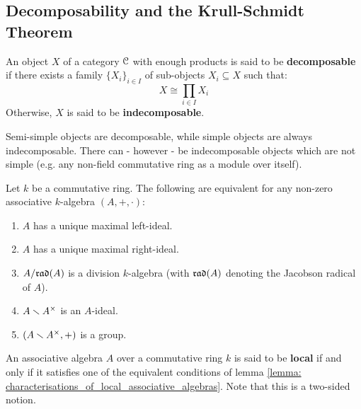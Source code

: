         \subsection{Decomposability and the Krull-Schmidt Theorem}
            \begin{definition} \label{def: (in)decomposable_objects}
                An object $X$ of a category $\mathcal{C}$ with enough products is said to be \textbf{decomposable} if there exists a family $\{X_i\}_{i \in I}$ of sub-objects $X_i \subseteq X$ such that:
                    $$X \cong \prod_{i \in I} X_i$$
                Otherwise, $X$ is said to be \textbf{indecomposable}.
            \end{definition}
            \begin{remark}
                Semi-simple objects are decomposable, while simple objects are always indecomposable. There can - however - be indecomposable objects which are not simple (e.g. any non-field commutative ring as a module over itself). 
            \end{remark}
            \begin{lemma} \label{lemma: characterisations_of_local_associative_algebras}
                \cite[Theorem 19.1]{lam_first_course_in_noncommutative_rings} Let $k$ be a commutative ring. The following are equivalent for any non-zero associative $k$-algebra $(A, +, \cdot)$:
                    \noindent
                    \begin{enumerate}
                        \item $A$ has a unique maximal left-ideal.
                        \item $A$ has a unique maximal right-ideal. 
                        \item $A/\mathfrak{rad}(A)$ is a division $k$-algebra (with $\mathfrak{rad}(A)$ denoting the Jacobson radical of $A$).
                        \item $A \setminus A^{\x}$ is an $A$-ideal.
                        \item $(A \setminus A^{\x}, +)$ is a group. 
                    \end{enumerate}
            \end{lemma}
            \begin{definition} \label{def: local_associative_algebras}
                An associative algebra $A$ over a commutative ring $k$ is said to be \textbf{local} if and only if it satisfies one of the equivalent conditions of lemma \ref{lemma: characterisations_of_local_associative_algebras}. Note that this is a two-sided notion.
            \end{definition}
